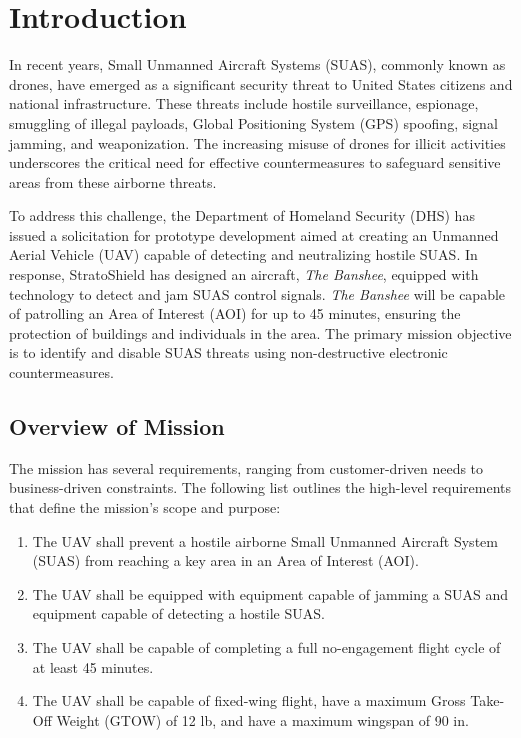 \chapter{Introduction} \label{cp:intro} %
In recent years, Small Unmanned Aircraft Systems (SUAS), commonly known as drones, have emerged as a significant security threat to United States citizens and national infrastructure. These threats include hostile surveillance, espionage, smuggling of illegal payloads, Global Positioning System (GPS) spoofing, signal jamming, and weaponization. The increasing misuse of drones for illicit activities underscores the critical need for effective countermeasures to safeguard sensitive areas from these airborne threats.

To address this challenge, the Department of Homeland Security (DHS) has issued a solicitation for prototype development aimed at creating an Unmanned Aerial Vehicle (UAV) capable of detecting and neutralizing hostile SUAS. In response, StratoShield has designed an aircraft, \textit{The Banshee}, equipped with technology to detect and jam SUAS control signals. \textit{The Banshee} will be capable of patrolling an Area of Interest (AOI) for up to 45 minutes, ensuring the protection of buildings and individuals in the area. The primary mission objective is to identify and disable SUAS threats using non-destructive electronic countermeasures.


\section{Overview of Mission} %
The mission has several requirements, ranging from customer-driven needs to business-driven constraints. The following list outlines the high-level requirements that define the mission’s scope and purpose:

\begin{enumerate}
    \item The UAV shall prevent a hostile airborne Small Unmanned Aircraft System (SUAS) from reaching a key area in an Area of Interest (AOI).
    \item The UAV shall be equipped with equipment capable of jamming a SUAS and equipment capable of detecting a hostile SUAS.
    \item The UAV shall be capable of completing a full no-engagement flight cycle of at least 45 minutes.
    \item The UAV shall be capable of fixed-wing flight, have a maximum Gross Take-Off Weight (GTOW) of 12 lb, and have a maximum wingspan of 90 in.
\end{enumerate}

